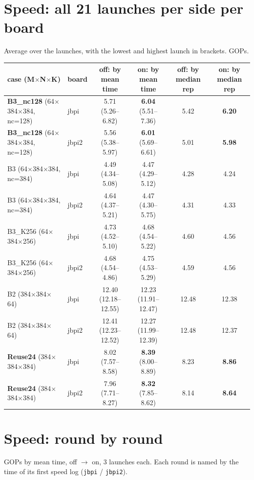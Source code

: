 \documentclass[10pt,a4paper]{article}
\newcommand{\down}[1]{\textcolor{blue!60!black}{#1}}
\newcommand{\good}[1]{\textcolor{green!45!black}{\textbf{#1}}}
\begin{document}
\section{Speed: all 21 launches per side per board}
Average over the launches, with the lowest and highest launch in brackets. GOPs.

\begin{center}\footnotesize\setlength{\tabcolsep}{4pt}
\begin{tabular}{@{}llcccc@{}}
\toprule
case (M$\times$N$\times$K) & board & off: by mean time & on: by mean time & off: by median rep & on: by median rep \\
\midrule
\textbf{B3\_nc128} (64$\times$384$\times$384, nc=128) & jbpi & 5.71 (5.26--6.82) & \good{6.04} (5.51--7.36) & 5.42 & \good{6.20} \\
\textbf{B3\_nc128} (64$\times$384$\times$384, nc=128) & jbpi2 & 5.56 (5.38--5.97) & \good{6.01} (5.69--6.61) & 5.01 & \good{5.98} \\
B3 (64$\times$384$\times$384, nc=384) & jbpi & 4.49 (4.34--5.08) & 4.47 (4.29--5.12) & 4.28 & 4.24 \\
B3 (64$\times$384$\times$384, nc=384) & jbpi2 & 4.64 (4.37--5.21) & 4.47 (4.30--5.75) & 4.31 & 4.33 \\
B3\_K256 (64$\times$384$\times$256) & jbpi & 4.73 (4.52--5.10) & 4.68 (4.54--5.22) & 4.60 & 4.56 \\
B3\_K256 (64$\times$384$\times$256) & jbpi2 & 4.68 (4.54--4.86) & 4.75 (4.53--5.29) & 4.59 & 4.56 \\
B2 (384$\times$384$\times$64) & jbpi & 12.40 (12.18--12.55) & \down{12.23} (11.91--12.47) & 12.48 & 12.38 \\
B2 (384$\times$384$\times$64) & jbpi2 & 12.41 (12.23--12.52) & \down{12.27} (11.99--12.39) & 12.48 & 12.37 \\
\textbf{Reuse24} (384$\times$384$\times$384) & jbpi & 8.02 (7.57--8.58) & \good{8.39} (8.00--8.89) & 8.23 & \good{8.86} \\
\textbf{Reuse24} (384$\times$384$\times$384) & jbpi2 & 7.96 (7.71--8.27) & \good{8.32} (7.85--8.62) & 8.14 & \good{8.64} \\
\bottomrule
\end{tabular}
\end{center}

\newpage
\section{Speed: round by round}
GOPs by mean time, off $\to$ on, 3 launches each. Each round is named by the time of its first speed log
(\texttt{jbpi} / \texttt{jbpi2}).
\end{document}
